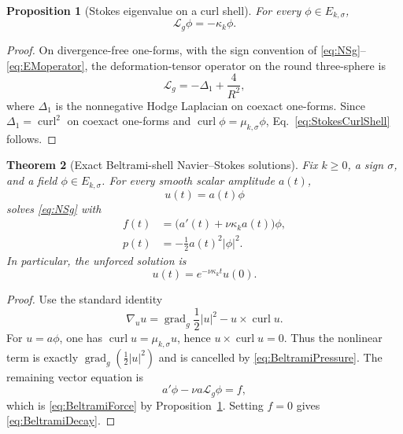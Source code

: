 \documentclass[aps,prd,reprint,superscriptaddress,nofootinbib,floatfix]{revtex4-2}
\newtheorem{theorem}{Theorem}
\newtheorem{proposition}[theorem]{Proposition}
\theoremstyle{definition}
\theoremstyle{remark}
\newcommand{\gradg}{\operatorname{grad}_g}
\newcommand{\cL}{\mathcal{L}}
\begin{document}
\begin{proposition}[Stokes eigenvalue on a curl shell]\label{prop:StokesCurlShell}
	For every $\phi\in E_{k,\sigma}$,
	\begin{equation}
		\cL_g\phi=-\kappa_k\phi .
		\label{eq:StokesCurlShell}
	\end{equation}
\end{proposition}

\begin{proof}
	On divergence-free one-forms, with the sign convention of
	\eqref{eq:NSg}--\eqref{eq:EMoperator}, the deformation-tensor operator on the
	round three-sphere is
	\begin{equation}
		\cL_g=-\Delta_1+\frac4{R^2},
		\label{eq:StokesHodgeCurl}
	\end{equation}
	where $\Delta_1$ is the nonnegative Hodge Laplacian on coexact one-forms.  Since
	$\Delta_1=\operatorname{curl}^2$ on coexact one-forms and
	$\operatorname{curl}\phi=\mu_{k,\sigma}\phi$, Eq.~\eqref{eq:StokesCurlShell}
	follows.
\end{proof}

\begin{theorem}[Exact Beltrami-shell Navier--Stokes solutions]\label{thm:BeltramiShell}
	Fix $k\ge0$, a sign $\sigma$, and a field $\phi\in E_{k,\sigma}$.  For every
	smooth scalar amplitude $a(t)$,
	\begin{equation}
		u(t)=a(t)\phi
		\label{eq:BeltramiAnsatz}
	\end{equation}
	solves \eqref{eq:NSg} with
	\begin{align}
		f(t) & =\bigl(a'(t)+\nu\kappa_k a(t)\bigr)\phi,
		\label{eq:BeltramiForce}                        \\
		p(t) & =-\frac12a(t)^2|\phi|^2 .
		\label{eq:BeltramiPressure}
	\end{align}
	In particular, the unforced solution is
	\begin{equation}
		u(t)=e^{-\nu\kappa_k t}u(0).
		\label{eq:BeltramiDecay}
	\end{equation}
\end{theorem}

\begin{proof}
	Use the standard identity
	\begin{equation}
		\nabla_u u=\gradg\frac12|u|^2-u\times\operatorname{curl}u .
		\label{eq:BeltramiVectorIdentity}
	\end{equation}
	For $u=a\phi$, one has
	$\operatorname{curl}u=\mu_{k,\sigma}u$, hence
	$u\times\operatorname{curl}u=0$.  Thus the nonlinear term is exactly
	$\gradg(\frac12|u|^2)$ and is cancelled by \eqref{eq:BeltramiPressure}.  The
	remaining vector equation is
	\[
		a'\phi-\nu a\cL_g\phi=f,
	\]
	which is \eqref{eq:BeltramiForce} by Proposition~\ref{prop:StokesCurlShell}.
	Setting $f=0$ gives \eqref{eq:BeltramiDecay}.
\end{proof}
\end{document}

